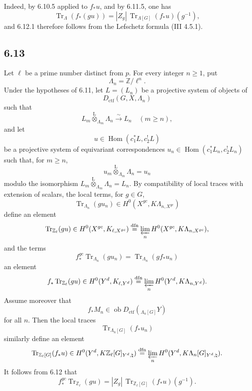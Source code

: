 \documentclass[11pt]{article}
\DeclareMathOperator{\Hom}{Hom}
\providecommand{\Tr}{\operatorname{Tr}}
\providecommand{\Tr}{\operatorname{Tr}}
\providecommand{\lten}{\overset{\mathrm L}{\otimes}}
\providecommand{\Ob}{\operatorname{ob}}
\providecommand{\Tr}{\operatorname{Tr}}
\providecommand{\Hom}{\operatorname{Hom}}
\providecommand{\lten}{\overset{\mathrm L}{\otimes}}
\providecommand{\lten}{\overset{\mathrm L}{\otimes}}
\providecommand{\Ob}{\operatorname{ob}}
\providecommand{\Tr}{\operatorname{Tr}}
\providecommand{\lten}{\overset{\mathrm L}{\otimes}}
\providecommand{\lten}{\overset{\mathrm L}{\otimes}}
\providecommand{\Ob}{\operatorname{Ob}}
\providecommand{\lten}{\overset{\mathrm L}{\otimes}}
\begin{document}
Indeed, by 6.10.5 applied to $f_*u$, and by 6.11.5, one has
\[
\Tr_{\Lambda}(f_*(gu))=|Z_g|\,\Tr_{\Lambda[G]}(f_*u)(g^{-1}),
\]
and 6.12.1 therefore follows from the Lefschetz formula (III 4.5.1).

\subsection*{6.13}
Let $\ell$ be a prime number distinct from $p$. For every integer $n\ge1$, put
\[
\Lambda_n=\mathbb Z/\ell^n.
\]
Under the hypotheses of 6.11, let $L=(L_n)$ be a projective system of objects of
\[
D_{\mathrm{ctf}}(G,X,\Lambda_n)
\]
such that
\[
L_m\lten_{\Lambda_m}\Lambda_n\xrightarrow{\sim}L_n\quad (m\ge n),
\]
and let
\[
u\in\Hom(c_1^*L,c_2^!L)
\]
be a projective system of equivariant correspondences $u_n\in\Hom(c_1^*L_n,c_2^!L_n)$ such that, for $m\ge n$,
\[
u_m\lten_{\Lambda_m}\Lambda_n=u_n
\]
modulo the isomorphism $L_m\lten_{\Lambda_m}\Lambda_n=L_n$. By compatibility of local traces with extension of scalars, the local terms, for $g\in G$,
\[
\Tr_{\Lambda_n}(gu_n)\in H^0(X^{gc},K\Lambda_{n,X^{gc}})
\]
define an element
\[
\Tr_{\mathbb Z_{\ell}}(gu)\in
H^0(X^{gc},K_{\ell,X^{gc}})
\stackrel{\mathrm{dfn}}{=}
\varprojlim_n H^0(X^{gc},K\Lambda_{n,X^{gc}}),
\]
and the terms
\[
f_*^{gc}\Tr_{\Lambda_n}(gu_n)=\Tr_{\Lambda_n}(gf_*u_n)
\]
an element
\[
f_*\Tr_{\mathbb Z_{\ell}}(gu)\in
H^0(Y^d,K_{\ell,Y^d})
\stackrel{\mathrm{dfn}}{=}
\varprojlim_n H^0(Y^d,K\Lambda_{n,Y^d}).
\]
Assume moreover that
\[
f_*M_n\in\Ob D_{\mathrm{ctf}}({}_{\Lambda_n[G]}Y)
\]
for all $n$. Then the local traces
\[
\Tr_{\Lambda_n[G]}(f_*u_n)
\]
similarly define an element
\[
\Tr_{\mathbb Z_{\ell}[G]}(f_*u)\in
H^0(Y^d,K\mathbb Z_{\ell}[G]_{Y^d,\natural})
\stackrel{\mathrm{dfn}}{=}
\varprojlim_n H^0(Y^d,K\Lambda_n[G]_{Y^d,\natural}).
\]
It follows from 6.12 that
\begin{equation}
f_*^{gc}\Tr_{\mathbb Z_{\ell}}(gu)
=
|Z_g|\,\Tr_{\mathbb Z_{\ell}[G]}(f_*u)(g^{-1}).
\tag{6.13.1}
\end{equation}
\end{document}
